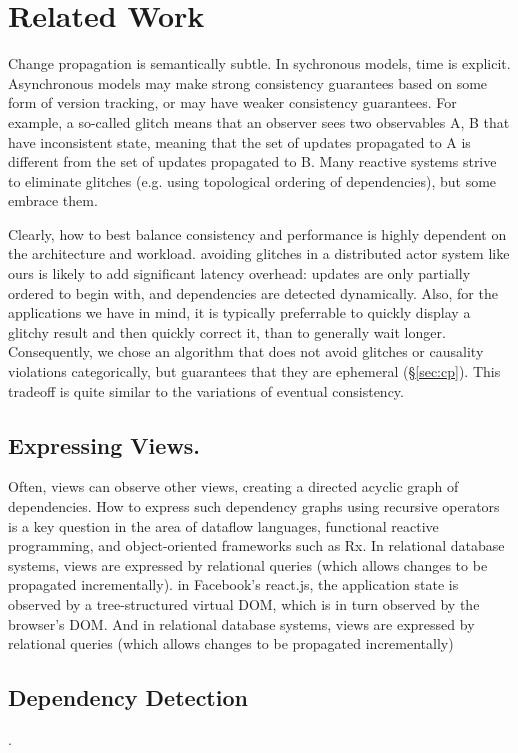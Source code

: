 \section{Related Work}

 
Change propagation is semantically subtle. In sychronous models, time is explicit. Asynchronous models may make strong consistency guarantees based on some form of version tracking, or may have weaker consistency guarantees. For example, a so-called glitch means that an observer sees two observables A, B that have inconsistent state, meaning that the set of updates propagated to A is different from the set of updates propagated to B. Many reactive systems strive to eliminate glitches (e.g. using topological ordering of dependencies), but some embrace them.

Clearly, how to best balance consistency and performance is highly dependent on the architecture and workload. 
avoiding glitches in a distributed actor system like ours is likely to add significant latency overhead: updates are only partially ordered to begin with, and dependencies are detected dynamically. Also, for the applications we have in mind, it is typically preferrable to quickly display a glitchy result and then quickly correct it, than to generally wait longer. Consequently, we chose an algorithm that does not avoid glitches or causality violations categorically, but guarantees that they are ephemeral (\S\ref{sec:cp}). This tradeoff is quite similar to the variations of eventual consistency.
 

\subsection{Expressing Views.} Often, views can observe other views, creating a directed acyclic graph of dependencies. How to express such dependency graphs using recursive operators is a key question in the area of dataflow languages, functional reactive programming, and object-oriented frameworks such as Rx. In relational database systems, views are expressed by relational queries (which allows changes to be propagated incrementally). in Facebook's react.js, the application state is observed by a tree-structured virtual DOM, which is in turn observed by the browser's DOM. And in relational database systems, views are expressed by relational queries (which allows changes to be propagated incrementally)

 
 \subsection{Dependency Detection}. 

